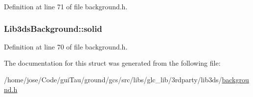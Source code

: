 Definition at line 71 of file background.\-h.

\hypertarget{struct_lib3ds_background_aa730e47345a354099d5f96914f3f0068}{
\subsubsection[{solid}]{ Lib3ds\-Background\-::solid}}\label{struct_lib3ds_background_aa730e47345a354099d5f96914f3f0068}


Definition at line 70 of file background.\-h.



The documentation for this struct was generated from the following file\-:\begin{DoxyCompactItemize}
\item 
/home/jose/\-Code/gui\-Tau/ground/gcs/src/libs/glc\-\_\-lib/3rdparty/lib3ds/\hyperlink{background_8h}{background.\-h}\end{DoxyCompactItemize}
